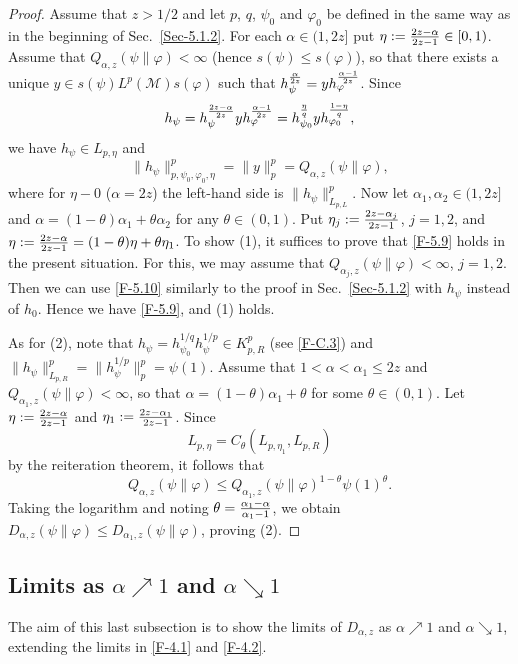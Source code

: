 \documentclass[12pt]{article}
\theoremstyle{definition}
\theoremstyle{remark}
\numberwithin{equation}{section}
\def\Me{\mathcal M}
\def\ffi{\varphi}
\begin{document}
\begin{proof}
Assume that $z>1/2$ and let $p$, $q$, $\psi_0$ and $\ffi_0$ be defined in the same way as in the beginning
of Sec.~\ref{Sec-5.1.2}. For each $\alpha\in(1,2z]$ put $\eta:={2z-\alpha\over2z-1}\in[0,1)$. Assume that
$Q_{\alpha,z}(\psi\|\ffi)<\infty$ (hence $s(\psi)\le s(\ffi)$), so that there exists a unique
$y\in s(\psi)L^p(\Me)s(\ffi)$ such that $h_\psi^{\alpha\over2z}=yh_\ffi^{\alpha-1\over2z}$. Since
\[
h_\psi=h_\psi^{2z-\alpha\over2z}yh_\ffi^{\alpha-1\over2z}
=h_{\psi_0}^{\eta\over q}yh_{\ffi_0}^{1-\eta\over q},
\]
we have $h_\psi\in L_{p,\eta}$ and
\[
\|h_\psi\|_{p,\psi_0,\ffi_0,\eta}^p=\|y\|_p^p=Q_{\alpha,z}(\psi\|\ffi),
\]
where for $\eta-0$ ($\alpha=2z$) the left-hand side is $\|h_\psi\|_{L_{p,L}}^p$. Now let
$\alpha_1,\alpha_2\in(1,2z]$ and $\alpha=(1-\theta)\alpha_1+\theta\alpha_2$ for any $\theta\in(0,1)$.
Put $\eta_j:={2z-\alpha_j\over2z-1}$, $j=1,2$, and $\eta:={2z-\alpha\over2z-1}=(1-\theta)\eta+\theta\eta_1$.
To show (1), it suffices to prove that \eqref{F-5.9} holds in the present situation. For this, we may assume
that $Q_{\alpha_j,z}(\psi\|\ffi)<\infty$, $j=1,2$. Then we can use \eqref{F-5.10} similarly to the proof in
Sec.~\ref{Sec-5.1.2} with $h_\psi$ instead of $h_0$. Hence we have \eqref{F-5.9}, and (1) holds.

As for (2), note that $h_\psi=h_{\psi_0}^{1/q}h_\psi^{1/p}\in K_{p,R}^p$ (see \eqref{F-C.3}) and
$\|h_\psi\|_{L_{p,R}}^p=\|h_\psi^{1/p}\|_p^p=\psi(1)$. Assume that $1<\alpha<\alpha_1\le2z$ and
$Q_{\alpha_1,z}(\psi\|\ffi)<\infty$, so that $\alpha=(1-\theta)\alpha_1+\theta$ for some $\theta\in(0,1)$.
Let $\eta:={2z-\alpha\over2z-1}$ and $\eta_1:={2z-\alpha_1\over2z-1}$. Since
\[
L_{p,\eta}=C_\theta(L_{p,\eta_1},L_{p,R})
\]
by the reiteration theorem, it follows that
\[
Q_{\alpha,z}(\psi\|\ffi)\le Q_{\alpha_1,z}(\psi\|\ffi)^{1-\theta}\psi(1)^\theta.
\]
Taking the logarithm and noting $\theta={\alpha_1-\alpha\over\alpha_1-1}$, we obtain
$D_{\alpha,z}(\psi\|\ffi)\le D_{\alpha_1,z}(\psi\|\ffi)$, proving (2).
\end{proof}


\subsection{Limits as $\alpha\nearrow1$ and $\alpha\searrow1$}

The aim of this last subsection is to show the limits of $D_{\alpha,z}$ as $\alpha\nearrow1$ and
$\alpha\searrow1$, extending the limits in \eqref{F-4.1} and \eqref{F-4.2}.
\end{document}
